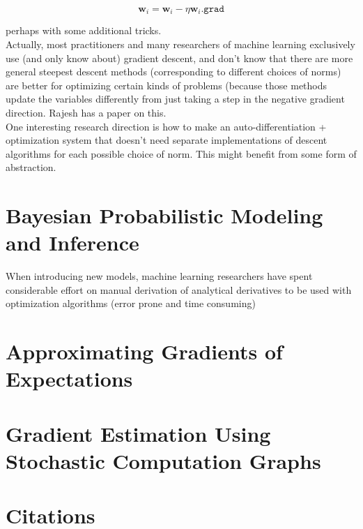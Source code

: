 \documentclass[11pt]{article}
\theoremstyle{definition}
\theoremstyle{plain}
\renewcommand{\v}[1]{\mathbf{#1}}
\begin{document}
 $$\v{w}_i = \v{w}_i - \eta \v{w}_i\texttt{.grad}$$

\noindent perhaps with some additional tricks.\\

\noindent Actually, most practitioners and many researchers 
of machine learning exclusively use (and only know about) gradient descent,
and don't know that there are more general steepest descent methods 
(corresponding to different choices of norms) are better for optimizing certain kinds 
of problems (because those methods update the variables differently from just
taking a step in the negative gradient direction. Rajesh has a paper on this.\\

\noindent One interesting research direction is how to make an auto-differentiation
+ optimization system that doesn't need separate implementations of descent
algorithms for each possible choice of norm. This might benefit from some
form of abstraction.

\section{Bayesian Probabilistic Modeling and Inference}

When introducing new models, machine learning researchers have spent considerable
effort on manual derivation of analytical derivatives to be used with
optimization algorithms (error prone and time consuming)\\

\noindent [ TODO ]

\section{Approximating Gradients of Expectations}

\noindent [ TODO ]

\section{Gradient Estimation Using Stochastic Computation Graphs}

\noindent [ TODO ] 

\newpage

\section{Citations}
\end{document}
